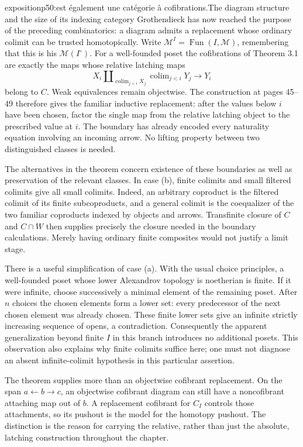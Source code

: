 
\begin{dcomment}{exposition}{p50:est également une catégorie à cofibrations.}{The diagram structure and the size of its indexing category}
Grothendieck has now reached the purpose of the preceding combinatorics: a diagram admits a replacement whose ordinary colimit can be trusted homotopically. Write $\mathcal M^I=\operatorname{Fun}(I,\mathcal M)$, remembering that this is his $\mathcal M(I^\circ)$. For a well-founded poset the cofibrations of Theorem 3.1 are exactly the maps whose relative latching maps
\[
 X_i\amalg_{\operatorname{colim}_{j<i}X_j}
                 \operatorname{colim}_{j<i}Y_j\longrightarrow Y_i
\]
belong to $C$. Weak equivalences remain objectwise. The construction at pages 45--49 therefore gives the familiar inductive replacement: after the values below $i$ have been chosen, factor the single map from the relative latching object to the prescribed value at $i$. The boundary has already encoded every naturality equation involving an incoming arrow. No lifting property between two distinguished classes is needed.

The alternatives in the theorem concern existence of these boundaries as well as preservation of the relevant classes. In case (b), finite colimits and small filtered colimits give all small colimits. Indeed, an arbitrary coproduct is the filtered colimit of its finite subcoproducts, and a general colimit is the coequalizer of the two familiar coproducts indexed by objects and arrows. Transfinite closure of $C$ and $C\cap W$ then supplies precisely the closure needed in the boundary calculations. Merely having ordinary finite composites would not justify a limit stage.

There is a useful simplification of case (a). With the usual choice principles, a well-founded poset whose lower Alexandrov topology is noetherian is finite. If it were infinite, choose successively a minimal element of the remaining poset. After $n$ choices the chosen elements form a lower set: every predecessor of the next chosen element was already chosen. These finite lower sets give an infinite strictly increasing sequence of opens, a contradiction. Consequently the apparent generalization beyond finite $I$ in this branch introduces no additional posets. This observation also explains why finite colimits suffice here; one must not diagnose an absent infinite-colimit hypothesis in this particular assertion.

The theorem supplies more than an objectwise cofibrant replacement. On the span $a\leftarrow b\rightarrow c$, an objectwise cofibrant diagram can still have a noncofibrant attaching map out of $b$. A replacement cofibrant for $C_I$ controls those attachments, so its pushout is the model for the homotopy pushout. The distinction is the reason for carrying the relative, rather than just the absolute, latching construction throughout the chapter.
\end{dcomment}

